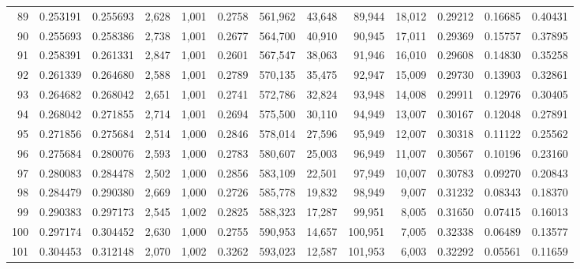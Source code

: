 \begin{tabular}{rrrrrrrrrrrrr}
89  &  0.253191 &  0.255693 &   2,628 &  1,001 &                                     0.2758 &  561,962 &   43,648 &   89,944 &   18,012 &  0.29212 &  0.16685 &  0.40431 \\
90  &  0.255693 &  0.258386 &   2,738 &  1,001 &                                     0.2677 &  564,700 &   40,910 &   90,945 &   17,011 &  0.29369 &  0.15757 &  0.37895 \\
91  &  0.258391 &  0.261331 &   2,847 &  1,001 &                                     0.2601 &  567,547 &   38,063 &   91,946 &   16,010 &  0.29608 &  0.14830 &  0.35258 \\
92  &  0.261339 &  0.264680 &   2,588 &  1,001 &                                     0.2789 &  570,135 &   35,475 &   92,947 &   15,009 &  0.29730 &  0.13903 &  0.32861 \\
93  &  0.264682 &  0.268042 &   2,651 &  1,001 &                                     0.2741 &  572,786 &   32,824 &   93,948 &   14,008 &  0.29911 &  0.12976 &  0.30405 \\
94  &  0.268042 &  0.271855 &   2,714 &  1,001 &                                     0.2694 &  575,500 &   30,110 &   94,949 &   13,007 &  0.30167 &  0.12048 &  0.27891 \\
95  &  0.271856 &  0.275684 &   2,514 &  1,000 &                                     0.2846 &  578,014 &   27,596 &   95,949 &   12,007 &  0.30318 &  0.11122 &  0.25562 \\
96  &  0.275684 &  0.280076 &   2,593 &  1,000 &                                     0.2783 &  580,607 &   25,003 &   96,949 &   11,007 &  0.30567 &  0.10196 &  0.23160 \\
97  &  0.280083 &  0.284478 &   2,502 &  1,000 &                                     0.2856 &  583,109 &   22,501 &   97,949 &   10,007 &  0.30783 &  0.09270 &  0.20843 \\
98  &  0.284479 &  0.290380 &   2,669 &  1,000 &                                     0.2726 &  585,778 &   19,832 &   98,949 &    9,007 &  0.31232 &  0.08343 &  0.18370 \\
99  &  0.290383 &  0.297173 &   2,545 &  1,002 &                                     0.2825 &  588,323 &   17,287 &   99,951 &    8,005 &  0.31650 &  0.07415 &  0.16013 \\
100 &  0.297174 &  0.304452 &   2,630 &  1,000 &                                     0.2755 &  590,953 &   14,657 &  100,951 &    7,005 &  0.32338 &  0.06489 &  0.13577 \\
101 &  0.304453 &  0.312148 &   2,070 &  1,002 &                                     0.3262 &  593,023 &   12,587 &  101,953 &    6,003 &  0.32292 &  0.05561 &  0.11659 \\

\end{tabular}
